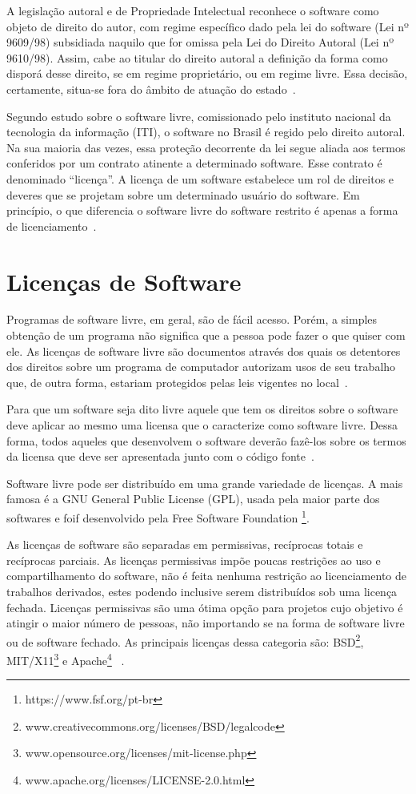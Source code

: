 A legislação autoral e de Propriedade Intelectual reconhece o software como objeto 
de direito do autor, com regime específico dado pela lei do software (Lei nº 9609/98)
subsidiada naquilo que for omissa pela Lei do Direito Autoral (Lei nº 9610/98).
%
Assim, cabe ao titular do direito autoral a definição da forma como disporá desse
direito, se em regime proprietário, ou em regime livre. Essa decisão, certamente,
situa-se fora do âmbito de atuação do estado~\cite{junior2005software}.

Segundo estudo sobre o software livre, comissionado pelo instituto nacional da 
tecnologia da informação (ITI), o software no Brasil é regido pelo direito autoral. 
Na sua maioria das vezes, essa proteção decorrente da lei segue aliada aos termos 
conferidos por um contrato atinente a determinado software. Esse contrato é 
denominado ``licença''. A licença de um software estabelece um rol de direitos e 
deveres que se projetam sobre um determinado usuário do software. Em princípio, 
o que diferencia o software livre do software restrito é apenas a forma de
licenciamento~\cite{kon2012software}.


\section{Licenças de Software}

Programas de software livre, em geral, são de fácil acesso. Porém, a simples obtenção
de um programa não significa que a pessoa pode fazer o que quiser com ele. As licenças
de software livre são documentos através dos quais os detentores dos direitos sobre um
programa de computador autorizam usos de seu trabalho que, de outra forma, estariam
protegidos pelas leis vigentes no local~\cite{sabino2009licenccas}.

Para que um software seja dito livre aquele que tem os direitos sobre o software
deve aplicar ao mesmo uma licensa que o caracterize como software livre. Dessa 
forma, todos aqueles que desenvolvem o software deverão fazê-los sobre os termos
da licensa que deve ser apresentada junto com o código fonte~\cite{sabino2009licenccas}.

Software livre pode ser distribuído em uma grande variedade de licenças.
A mais famosa é a GNU General Public License (GPL), usada pela maior
parte dos softwares e foif desenvolvido pela Free Software Foundation \footnote{https://www.fsf.org/pt-br}.

As licenças de software são separadas em permissivas, recíprocas totais e recíprocas
parciais.
%
As licenças permissivas impõe poucas restrições ao uso e compartilhamento do
software, não é feita nenhuma restrição ao licenciamento de trabalhos derivados, 
estes podendo inclusive serem distribuídos sob uma licença fechada. Licenças permissivas são 
uma ótima opção para projetos cujo objetivo é atingir o maior número de pessoas, 
não importando se na forma de software livre ou de software fechado. As principais 
licenças dessa categoria são: BSD\footnote{www.creativecommons.org/licenses/BSD/legalcode},
MIT/X11\footnote{www.opensource.org/licenses/mit-license.php} e Apache\footnote{www.apache.org/licenses/LICENSE-2.0.html}
~\cite{sabino2009licenccas}.

